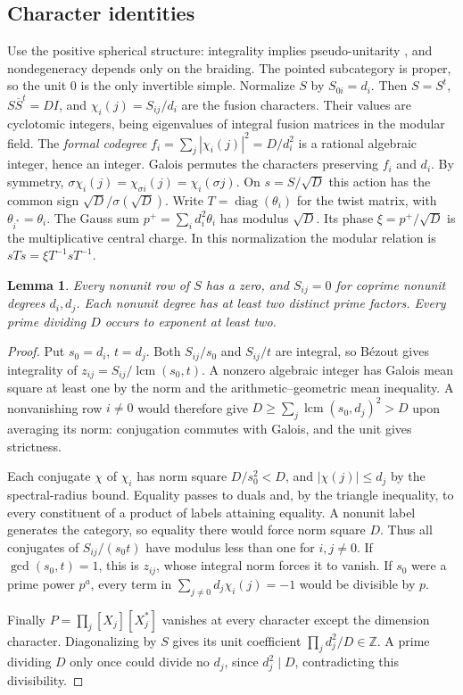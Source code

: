 \documentclass[11pt]{amsart}
\numberwithin{equation}{section}
\newtheorem{lemma}[theorem]{Lemma}
\DeclareMathOperator{\lcm}{lcm}
\begin{document}
\subsection{Character identities}
Use the positive spherical structure: integrality implies pseudo-unitarity
\cite[Proposition~8.24]{ENOannals}, and nondegeneracy depends only on the
braiding. The pointed subcategory is proper, so the unit $0$ is the only
invertible simple. Normalize $S$ by $S_{0i}=d_i$. Then $S=S^t$,
$S\overline S^t=DI$, and $\chi_i(j)=S_{ij}/d_i$ are the fusion characters.
Their values are cyclotomic integers, being eigenvalues of integral fusion
matrices in the modular field. The \emph{formal codegree}
$f_i=\sum_j|\chi_i(j)|^2=D/d_i^2$ is a rational algebraic integer, hence an
integer. Galois permutes the characters preserving $f_i$ and $d_i$. By
symmetry, $\sigma\chi_i(j)=\chi_{\sigma i}(j)=\chi_i(\sigma j)$.
On $s=S/\sqrt D$ this action has the common sign
$\sqrt D/\sigma(\sqrt D)$. Write $T=\operatorname{diag}(\theta_i)$ for
the twist matrix, with $\theta_{i^*}=\theta_i$. The Gauss sum
$p^+=\sum_i d_i^2\theta_i$ has modulus $\sqrt D$. Its phase
$\xi=p^+/\sqrt D$ is the multiplicative central charge. In this
normalization the modular relation is $sTs=\xi T^{-1}sT^{-1}$.

\begin{lemma}\label{lem:basic-table}
Every nonunit row of $S$ has a zero, and $S_{ij}=0$ for coprime nonunit
degrees $d_i,d_j$. Each nonunit degree has at least two distinct prime
factors. Every prime dividing $D$ occurs to exponent at least two.
\end{lemma}
\begin{proof}
Put $s_0=d_i$, $t=d_j$. Both $S_{ij}/s_0$ and $S_{ij}/t$ are integral,
so B\'ezout gives integrality of $z_{ij}=S_{ij}/\lcm(s_0,t)$.
A nonzero algebraic integer has Galois mean square at least one by the
norm and the arithmetic--geometric mean inequality. A nonvanishing row
$i\ne0$ would therefore give $D\ge\sum_j\lcm(s_0,d_j)^2>D$ upon averaging
its norm: conjugation commutes with Galois, and the unit gives strictness.

Each conjugate $\chi$ of $\chi_i$ has norm square $D/s_0^2<D$, and
$|\chi(j)|\le d_j$ by the spectral-radius bound. Equality passes to
duals and, by the triangle inequality, to every constituent of a product
of labels attaining equality. A nonunit label generates the category, so
equality there would force norm square $D$. Thus all conjugates of
$S_{ij}/(s_0t)$ have modulus less than one for $i,j\ne0$. If
$\gcd(s_0,t)=1$, this is $z_{ij}$, whose integral norm forces it to vanish.
If $s_0$ were a prime power $p^a$, every term in
$\sum_{j\ne0}d_j\chi_i(j)=-1$ would be divisible by $p$.

Finally $P=\prod_j[X_j][X_j^*]$ vanishes at every character except the
dimension character. Diagonalizing by $S$ gives its unit coefficient
$\prod_j d_j^2/D\in\mathbb Z$. A prime dividing $D$ only once could divide
no $d_j$, since $d_j^2\mid D$, contradicting this divisibility.
\end{proof}
\end{document}

